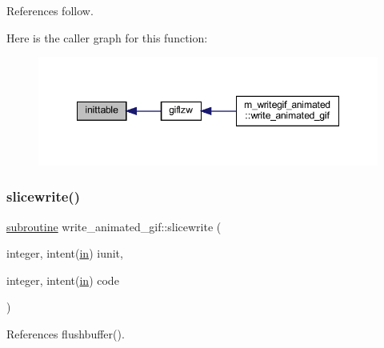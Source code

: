 References follow.

Here is the caller graph for this function\+:
\nopagebreak
\begin{figure}[H]
\begin{center}
\leavevmode
\includegraphics[width=348pt]{M__writegif__animated_8f90_acd7274fbac8690a12be91b542378a4eb_icgraph}
\end{center}
\end{figure}
\mbox{\label{M__writegif__animated_8f90_ac5c0245eea61f109cbf3ce5bbf38981b}} 
\subsubsection{\texorpdfstring{slicewrite()}{slicewrite()}}
{\footnotesize\ttfamily \hyperlink{M__stopwatch_83_8txt_acfbcff50169d691ff02d4a123ed70482}{subroutine} write\+\_\+animated\+\_\+gif\+::slicewrite (\begin{DoxyParamCaption}\item[{integer, intent(\hyperlink{M__journal_83_8txt_afce72651d1eed785a2132bee863b2f38}{in})}]{iunit,  }\item[{integer, intent(\hyperlink{M__journal_83_8txt_afce72651d1eed785a2132bee863b2f38}{in})}]{code }\end{DoxyParamCaption})\hspace{0.3cm}{\ttfamily [private]}}



References flushbuffer().

